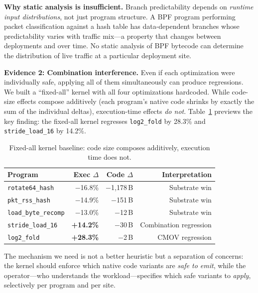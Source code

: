 \documentclass[sigconf,anonymous]{acmart}
\begin{document}
\textbf{Why static analysis is insufficient.} Branch predictability
depends on \emph{runtime input distributions}, not just program
structure. A BPF program performing packet classification against a
hash table has data-dependent branches whose predictability varies with
traffic mix---a property that changes between deployments and over time.
No static analysis of BPF bytecode can determine the distribution of
live traffic at a particular deployment site.

\textbf{Evidence 2: Combination interference.}
Even if each optimization were individually safe, applying all of them
simultaneously can produce regressions. We built a ``fixed-all'' kernel
with all four optimizations hardcoded. While code-size effects compose
additively (each program's native code shrinks by exactly the sum of the
individual deltas), execution-time effects \emph{do not}.
Table~\ref{tab:fixed_preview} previews the key finding: the fixed-all
kernel regresses \texttt{log2\_fold} by 28.3\% and
\texttt{stride\_load\_16} by 14.2\%.

\begin{table}[t]
  \centering
  \caption{Fixed-all kernel baseline: code size composes additively,
  execution time does not.}
  \label{tab:fixed_preview}
  \small
  \begin{tabular}{lrrr}
    \toprule
    Program & Exec $\Delta$ & Code $\Delta$ & Interpretation \\
    \midrule
    \texttt{rotate64\_hash}     & $-$16.8\% & $-$1{,}178\,B & Substrate win \\
    \texttt{pkt\_rss\_hash}     & $-$14.9\% & $-$151\,B  & Substrate win \\
    \texttt{load\_byte\_recomp} & $-$13.0\% & $-$12\,B   & Substrate win \\
    \texttt{stride\_load\_16}   & \textbf{+14.2\%} & $-$30\,B   & Combination regression \\
    \texttt{log2\_fold}         & \textbf{+28.3\%} & $-$2\,B    & CMOV regression \\
    \bottomrule
  \end{tabular}
\end{table}

The mechanism we need is not a better heuristic but a separation of
concerns: the kernel should enforce which native code variants are
\emph{safe to emit}, while the operator---who understands the
workload---specifies which safe variants to \emph{apply}, selectively
per program and per site.

\end{document}
